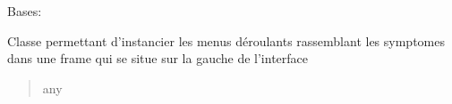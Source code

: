 \documentclass[letterpaper,10pt,english]{sphinxmanual}
\begin{document}

\begin{fulllineitems}
\label{\detokenize{general_interface:general_interface_V9.Menu_symptomes}}
\pysigstartsignatures
{}
\pysigstopsignatures
\sphinxAtStartPar
Bases: 

\sphinxAtStartPar
Classe permettant d’instancier les menus déroulants rassemblant les symptomes dans une frame qui se situe sur la gauche de l’interface

\begin{fulllineitems}
\label{\detokenize{general_interface:general_interface_V9.Menu_symptomes.master}}
\pysigstartsignatures
{}
\pysigstopsignatures\begin{quote}\begin{description}
\sphinxAtStartPar
any

\end{description}\end{quote}

\end{fulllineitems}



\begin{fulllineitems}

\pysigstartsignatures
{}
\pysigstopsignatures\begin{quote}\begin{description}
\sphinxAtStartPar
{\hyperref[\detokenize{general_interface:general_interface_V9.InterfaceGenerale}]{}}

\end{description}\end{quote}


\end{fulllineitems}
\end{fulllineitems}
\end{document}

